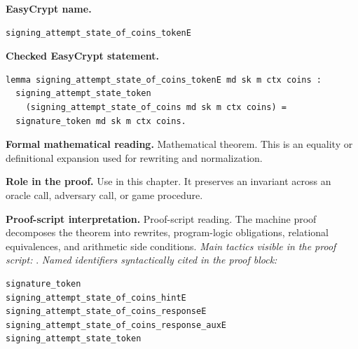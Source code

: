 \begin{formaltheorem}
\noindent\textbf{EasyCrypt name.}
\begin{lstlisting}[language=EasyCrypt,basicstyle=\ttfamily\scriptsize]
signing_attempt_state_of_coins_tokenE
\end{lstlisting}
\noindent\textbf{Checked EasyCrypt statement.}
\begin{lstlisting}[language=EasyCrypt,basicstyle=\ttfamily\scriptsize]
lemma signing_attempt_state_of_coins_tokenE md sk m ctx coins :
  signing_attempt_state_token
    (signing_attempt_state_of_coins md sk m ctx coins) =
  signature_token md sk m ctx coins.
\end{lstlisting}
\noindent\textbf{Formal mathematical reading.}
Mathematical theorem. This is an equality or definitional expansion used for rewriting and normalization.

\noindent\textbf{Role in the proof.}
Use in this chapter. It preserves an invariant across an oracle call, adversary call, or game procedure.

\noindent\textbf{Proof-script interpretation.}
Proof-script reading. The machine proof decomposes the theorem into rewrites, program-logic obligations, relational equivalences, and arithmetic side conditions.
\emph{Main tactics visible in the proof script:} .
\emph{Named identifiers syntactically cited in the proof block:}
\begin{lstlisting}[language=EasyCrypt,basicstyle=\ttfamily\scriptsize]
signature_token
signing_attempt_state_of_coins_hintE
signing_attempt_state_of_coins_responseE
signing_attempt_state_of_coins_response_auxE
signing_attempt_state_token
\end{lstlisting}

\end{formaltheorem}

